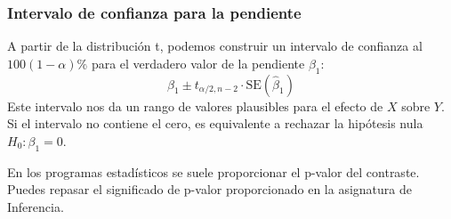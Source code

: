 \documentclass[
  letterpaper,
  DIV=11,
  numbers=noendperiod]{scrreprt}
\begin{document}
\subsubsection{Intervalo de confianza para la
pendiente}\label{intervalo-de-confianza-para-la-pendiente}

A partir de la distribución t, podemos construir un intervalo de
confianza al \(100(1-\alpha)\%\) para el verdadero valor de la pendiente
\(\beta_1\): \[
\hat{\beta}_1 \pm t_{\alpha/2, n-2} \cdot \text{SE}(\hat{\beta}_1)
\] Este intervalo nos da un rango de valores plausibles para el efecto
de \(X\) sobre \(Y\). Si el intervalo no contiene el cero, es
equivalente a rechazar la hipótesis nula \(H_0: \beta_1 = 0\).

\begin{tcolorbox}[enhanced jigsaw, breakable, toprule=.15mm, bottomtitle=1mm, coltitle=black, colbacktitle=quarto-callout-important-color!10!white, titlerule=0mm, opacitybacktitle=0.6, bottomrule=.15mm, toptitle=1mm, title=\textcolor{quarto-callout-important-color}{\faExclamation}\hspace{0.5em}{Para recordar}, arc=.35mm, rightrule=.15mm, opacityback=0, colframe=quarto-callout-important-color-frame, leftrule=.75mm, left=2mm, colback=white]

En los programas estadísticos se suele proporcionar el p-valor del
contraste. Puedes repasar el significado de p-valor proporcionado en la
asignatura de Inferencia.

\end{tcolorbox}
\end{document}
